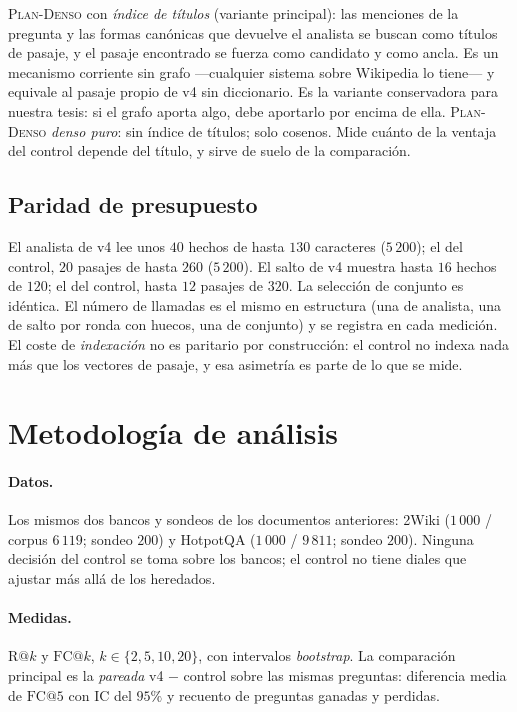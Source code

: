 \documentclass[11pt,a4paper]{article}
\newcommand{\gl}{\guillemotleft}
\newcommand{\gr}{\guillemotright}
\newcommand{\ctrl}{\textsc{Plan-Denso}}
\begin{document}
\ctrl{} con \emph{índice de títulos} (variante principal): las menciones de
la pregunta y las formas canónicas que devuelve el analista se buscan como
títulos de pasaje, y el pasaje encontrado se fuerza como candidato y como
ancla. Es un mecanismo corriente sin grafo ---cualquier sistema sobre
Wikipedia lo tiene--- y equivale al \gl{}pasaje propio\gr{} de v4 sin
diccionario. Es la variante conservadora para nuestra tesis: si el grafo
aporta algo, debe aportarlo por encima de ella. \ctrl{} \emph{denso puro}:
sin índice de títulos; solo cosenos. Mide cuánto de la ventaja del control
depende del título, y sirve de suelo de la comparación.

\subsection{Paridad de presupuesto}

El analista de v4 lee unos $40$ hechos de hasta $130$ caracteres
($5\,200$); el del control, $20$ pasajes de hasta $260$ ($5\,200$). El salto
de v4 muestra hasta $16$ hechos de $120$; el del control, hasta $12$
pasajes de $320$. La selección de conjunto es idéntica. El número de
llamadas es el mismo en estructura (una de analista, una de salto por ronda
con huecos, una de conjunto) y se registra en cada medición. El coste de
\emph{indexación} no es paritario por construcción: el control no indexa
nada más que los vectores de pasaje, y esa asimetría es parte de lo que se
mide.

\section{Metodología de análisis}
\label{sec:analisis}

\paragraph{Datos.}
Los mismos dos bancos y sondeos de los documentos anteriores: 2Wiki
($1\,000$ / corpus $6\,119$; sondeo $200$) y HotpotQA ($1\,000$ / $9\,811$;
sondeo $200$). Ninguna decisión del control se toma sobre los bancos; el
control no tiene diales que ajustar más allá de los heredados.

\paragraph{Medidas.}
$\mathrm{R@}k$ y $\mathrm{FC@}k$, $k\in\{2,5,10,20\}$, con intervalos
\emph{bootstrap}. La comparación principal es la \emph{pareada} v4 $-$
control sobre las mismas preguntas: diferencia media de $\mathrm{FC@}5$ con
IC del $95\%$ y recuento de preguntas ganadas y perdidas.
\end{document}
